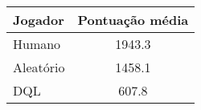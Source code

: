 \begin{center}
\begin{tabular}{l c}
\hline
Jogador & Pontuação média \\
\hline
Humano & 1943.3 \\
Aleatório & 1458.1 \\
DQL & 607.8 \\
\hline
\end{tabular}
\label{table:asteroids_score}
\end{center}


%
%



